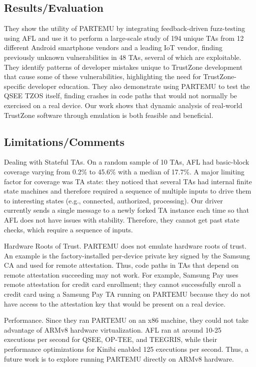 \subsection{Results/Evaluation}
They show the utility of PARTEMU by integrating feedback-driven fuzz-testing using AFL and use it to perform a large-scale study of 194 unique TAs from 12 different Android smartphone vendors and a leading IoT vendor, finding previously unknown vulnerabilities in 48 TAs, several of which are exploitable. They identify patterns of developer mistakes unique to TrustZone development that cause some of these vulnerabilities, highlighting the need for TrustZone-specific developer education.  They also demonstrate using PARTEMU to test the QSEE TZOS itself, finding crashes in code paths that would not normally be exercised on a real device. Our work shows that dynamic analysis of real-world TrustZone software through emulation is both feasible and beneficial.
\subsection{Limitations/Comments}
Dealing with Stateful TAs. On a random sample of 10 TAs, AFL had basic-block coverage varying from 0.2\% to 45.6\% with a median of 17.7\%. A major limiting factor for coverage was TA state: they noticed that several TAs had internal finite state machines and therefore required a sequence of multiple inputs to drive them to interesting states (e.g., connected, authorized, processing). Our driver currently sends a single message to a newly forked TA instance each time so that AFL does not have issues with stability. Therefore, they cannot get past state checks, which require a sequence of inputs.

Hardware Roots of Trust. PARTEMU does not emulate hardware roots of trust. An example is the factory-installed per-device private key signed by the Samsung CA and used for remote attestation. Thus, code paths in TAs that depend on remote attestation succeeding may not work. For example, Samsung Pay uses remote attestation for credit card enrollment; they cannot successfully enroll a credit card using a Samsung Pay TA running on PARTEMU because they do not have access to the attestation key that would be present on a real device.

Performance. Since they ran PARTEMU on an x86 machine, they could not take advantage of ARMv8 hardware virtualization. AFL ran at around 10-25 executions per second for QSEE, OP-TEE, and TEEGRIS, while their performance optimizations for Kinibi enabled 125 executions per second. Thus, a future work is to explore running PARTEMU directly on ARMv8 hardware.
\newpage

